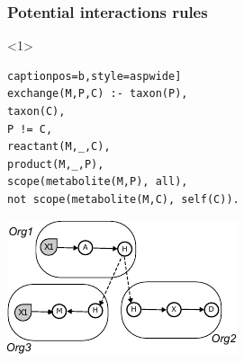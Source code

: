\documentclass[8pt,usenames,dvipsnames]{beamer}
\begin{document}
%


\begin{frame}[fragile]
\frametitle{Potential interactions rules}
\begin{onlyenv}<1>
\begin{minipage}{0.5\textwidth}
\begin{lstlisting}[mathescape=True, label={lst:echange}] captionpos=b,style=aspwide]
exchange(M,P,C) :- taxon(P),
taxon(C),
P != C,
reactant(M,_,C),
product(M,_,P),
scope(metabolite(M,P), all),
not scope(metabolite(M,C), self(C)).
\end{lstlisting}
\end{minipage}%
\hspace{0.25cm}
\hfill
\begin{minipage}{0.45\textwidth}
\includegraphics[width=\textwidth]{figures/exchanged.pdf}

\end{minipage}
\end{onlyenv}
\end{frame}
\end{document}

